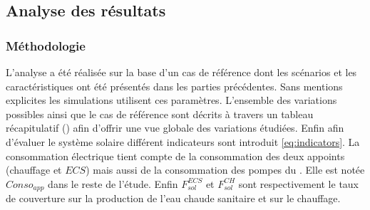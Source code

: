 



\subsection{Analyse des résultats} %
\label{sub:analyse_des_resultats}
\subsubsection{Méthodologie} %
\label{ssub:methodologie}
L’analyse a été réalisée sur la base d’un cas de référence dont les scénarios et les
caractéristiques ont été présentés dans les parties précédentes. Sans mentions explicites les
simulations utilisent ces paramètres. L’ensemble des variations possibles ainsi que
le cas de référence sont décrits à travers un tableau récapitulatif ()
afin d’offrir une vue globale des variations étudiées.
Enfin afin d’évaluer le système solaire différent indicateurs sont introduit
\eqref{eq:indicators}. La consommation électrique tient compte de la consommation des deux
appoints (chauffage et $ECS$) mais aussi de la consommation des pompes du . Elle est
notée $Conso_{app}$ dans le reste de l’étude. Enfin $F_{sol}^{ECS}$ et $F_{sol}^{CH}$
sont respectivement le taux de couverture sur la production de l’eau chaude sanitaire
et sur le chauffage.

